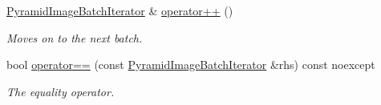 \begin{DoxyCompactItemize}
\hyperlink{classdg_1_1deepcore_1_1imagery_1_1_pyramid_image_batch_iterator}{Pyramid\+Image\+Batch\+Iterator} \& \hyperlink{group___imagery_module_ga8a830889046c718cbfcb4067a33908f3}{operator++} ()
\begin{DoxyCompactList}\small\item\em Moves on to the next batch. \end{DoxyCompactList}\item 
bool \hyperlink{group___imagery_module_ga6ebbb4ad321f8a6fff0423155a784e3c}{operator==} (const \hyperlink{classdg_1_1deepcore_1_1imagery_1_1_pyramid_image_batch_iterator}{Pyramid\+Image\+Batch\+Iterator} \&rhs) const noexcept
\begin{DoxyCompactList}\small\item\em The equality operator. \end{DoxyCompactList}\end{DoxyCompactItemize}
